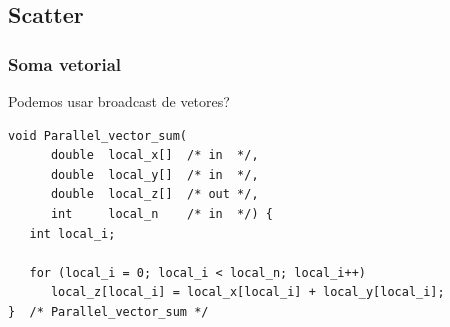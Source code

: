\documentclass[xcolor={usenames,dvipsnames},12pt,presentation,aspectratio=169]{beamer}
\begin{document}
\subsection{Scatter}
\begin{frame}[fragile]
  \frametitle{Soma vetorial}
  Podemos usar broadcast de vetores?
\begin{center}
\begin{minipage}{0.95\textwidth}
  \begin{verbatim}
void Parallel_vector_sum(
      double  local_x[]  /* in  */, 
      double  local_y[]  /* in  */, 
      double  local_z[]  /* out */, 
      int     local_n    /* in  */) {
   int local_i;

   for (local_i = 0; local_i < local_n; local_i++)
      local_z[local_i] = local_x[local_i] + local_y[local_i];
}  /* Parallel_vector_sum */

  \end{verbatim}
\end{minipage}
\end{center}
\end{frame}
\end{document}
